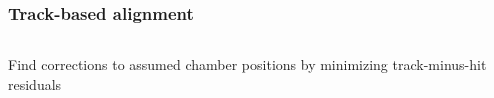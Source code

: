 \documentclass[compress]{beamer}
\begin{document}

\begin{frame}
\frametitle{Track-based alignment}

\begin{columns}
Find corrections to assumed chamber positions by minimizing track-minus-hit residuals
\end{columns}


\end{frame}
\end{document}

